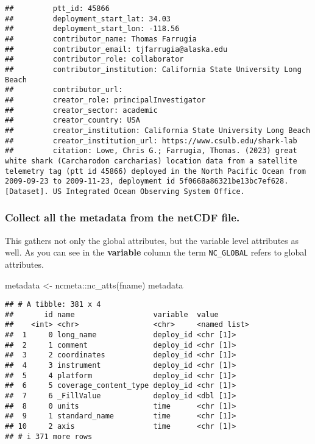 \documentclass[
]{book}
\newenvironment{Shaded}{\begin{snugshade}}{\end{snugshade}}
\newcommand{\FunctionTok}[1]{\textcolor[rgb]{0.00,0.00,0.00}{#1}}
\newcommand{\NormalTok}[1]{#1}
\newcommand{\OtherTok}[1]{\textcolor[rgb]{0.56,0.35,0.01}{#1}}
\newcommand{\SpecialCharTok}[1]{\textcolor[rgb]{0.00,0.00,0.00}{#1}}
\begin{document}
\begin{verbatim}
##         ptt_id: 45866
##         deployment_start_lat: 34.03
##         deployment_start_lon: -118.56
##         contributor_name: Thomas Farrugia
##         contributor_email: tjfarrugia@alaska.edu
##         contributor_role: collaborator
##         contributor_institution: California State University Long Beach
##         contributor_url: 
##         creator_role: principalInvestigator
##         creator_sector: academic
##         creator_country: USA
##         creator_institution: California State University Long Beach
##         creator_institution_url: https://www.csulb.edu/shark-lab
##         citation: Lowe, Chris G.; Farrugia, Thomas. (2023) great white shark (Carcharodon carcharias) location data from a satellite telemetry tag (ptt id 45866) deployed in the North Pacific Ocean from 2009-09-23 to 2009-11-23, deployment id 5f0668a86321be13bc7ef628. [Dataset]. US Integrated Ocean Observing System Office.
\end{verbatim}

\hypertarget{collect-all-the-metadata-from-the-netcdf-file.}{%
\subsubsection{Collect all the metadata from the netCDF file.}\label{collect-all-the-metadata-from-the-netcdf-file.}}

This gathers not only the global attributes, but the variable level attributes as well. As you can see in the \textbf{variable} column the term \texttt{NC\_GLOBAL} refers to global attributes.

\begin{Shaded}
\begin{Highlighting}[]
\NormalTok{metadata }\OtherTok{\textless{}{-}}\NormalTok{ ncmeta}\SpecialCharTok{::}\FunctionTok{nc\_atts}\NormalTok{(fname)}
\NormalTok{metadata}
\end{Highlighting}
\end{Shaded}

\begin{verbatim}
## # A tibble: 381 x 4
##       id name                  variable  value       
##    <int> <chr>                 <chr>     <named list>
##  1     0 long_name             deploy_id <chr [1]>   
##  2     1 comment               deploy_id <chr [1]>   
##  3     2 coordinates           deploy_id <chr [1]>   
##  4     3 instrument            deploy_id <chr [1]>   
##  5     4 platform              deploy_id <chr [1]>   
##  6     5 coverage_content_type deploy_id <chr [1]>   
##  7     6 _FillValue            deploy_id <dbl [1]>   
##  8     0 units                 time      <chr [1]>   
##  9     1 standard_name         time      <chr [1]>   
## 10     2 axis                  time      <chr [1]>   
## # i 371 more rows
\end{verbatim}
\end{document}
